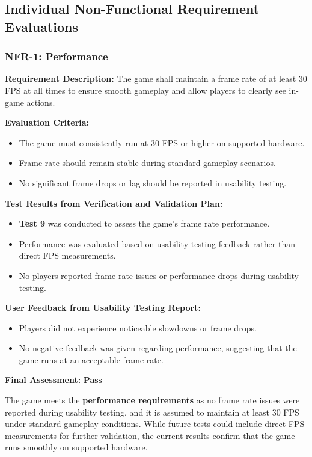 \documentclass[12pt, titlepage]{article}
\begin{document}
\subsection{Individual Non-Functional Requirement Evaluations}


\subsubsection{NFR-1: Performance}
\label{NFR1} 

\textbf{Requirement Description:}  
The game shall maintain a frame rate of at least 30 FPS at all times to ensure smooth gameplay and allow players to clearly see in-game actions.

\textbf{Evaluation Criteria:}  
\begin{itemize}
    \item The game must consistently run at 30 FPS or higher on supported hardware.
    \item Frame rate should remain stable during standard gameplay scenarios.
    \item No significant frame drops or lag should be reported in usability testing.
\end{itemize}

\textbf{Test Results from Verification and Validation Plan:}  
\begin{itemize}
    \item \textbf{Test 9} was conducted to assess the game's frame rate performance.
    \item Performance was evaluated based on usability testing feedback rather than direct FPS measurements.
    \item No players reported frame rate issues or performance drops during usability testing.
\end{itemize}

\textbf{User Feedback from Usability Testing Report:}  
\begin{itemize}
    \item Players did not experience noticeable slowdowns or frame drops.
    \item No negative feedback was given regarding performance, suggesting that the game runs at an acceptable frame rate.
\end{itemize}

\textbf{Final Assessment:} \textbf{Pass}  

The game meets the \textbf{performance requirements} as no frame rate issues were reported during usability testing, and it is assumed to maintain at least 30 FPS under standard gameplay conditions. While future tests could include direct FPS measurements for further validation, the current results confirm that the game runs smoothly on supported hardware.
\end{document}

